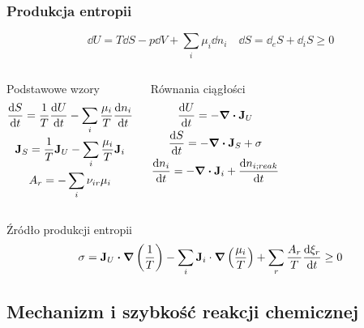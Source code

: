 \documentclass{beamer}
\begin{document}
\begin{frame}
\frametitle{Produkcja entropii}
\begin{equation*}
\dd{U} = T\dd{S} - p\dd{V} + \sum_{i}\mu_{i}\dd{n_{i}} \quad \dd{S} = \dd_{e}S +  \dd_{i}S \geq 0
\end{equation*}
\begin{columns}
\begin{block}{Podstawowe wzory}
\begin{gather*}
\dv{S}{t}=\frac{1}{T}\dv{U}{t}-\sum_{i}\frac{\mu_{i}}{T}\dv{n_{i}}{t} \\
\vb{J}_{S}=\frac{1}{T}\vb{J}_{U}-\sum_{i}\frac{\mu_{i}}{T}\vb{J}_{i} \\
A_{r}=-\sum_{i}\nu_{ir}\mu_{i}
\end{gather*}
\end{block}
\begin{block}{Równania ciągłości}
\begin{gather*}
	\dv{U}{t}=-\div{\vb{J}_{U}} \\
	\dv{S}{t} = -\div{\vb{J}_{S}} + \sigma \\
	\dv{n_{i}}{t}=-\div{\vb{J}_{i}}+\dv{n_{i;reak}}{t}
\end{gather*}
\end{block}
\end{columns}
\begin{block}{Źródło produkcji entropii}
\begin{equation*}
\sigma=\vb{J}_{U}\vdot\grad{\left(\frac{1}{T}\right)}-\sum_{i}\vb{J}_{i}\cdot\grad{\left(\frac{\mu_{i}}{T}\right)}+\sum_{r}\frac{A_{r}}{T}\dv{\xi_{r}}{t}\geq0
\end{equation*}
\end{block}
\end{frame}

\subsection{Mechanizm i szybkość reakcji chemicznej}
\end{document}
